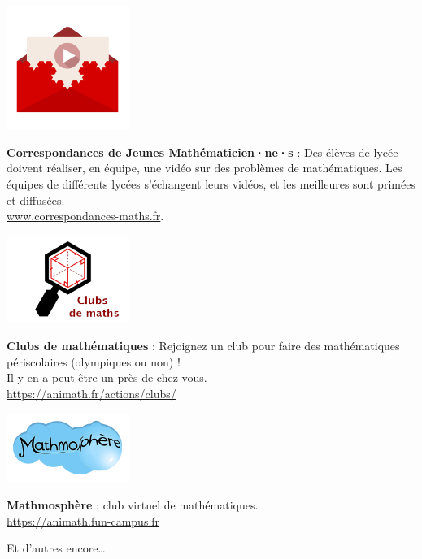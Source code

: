 \begin{minipage}[c]{.46\linewidth}
\includegraphics[width=40mm]{01-Intro/logos/correspondances.png}
\end{minipage}
\begin{minipage}[c]{.46\linewidth}	
\textbf{Correspondances de Jeunes Mathématicien·ne·s} :
Des élèves de lycée doivent réaliser, en équipe, une vidéo sur des problèmes de mathématiques. Les équipes de différents lycées s'échangent leurs vidéos, et les meilleures sont primées et diffusées.
\\ \url{www.correspondances-maths.fr}.
\end{minipage} \hfill


\vspace{4mm}



\begin{minipage}[c]{.46\linewidth}
\includegraphics[width=40mm]{01-Intro/logos/clubs_de_maths.png}
\end{minipage}
\begin{minipage}[c]{.46\linewidth}	
\textbf{Clubs de mathématiques} :
Rejoignez un club pour faire des mathématiques périscolaires (olympiques ou non) ! \\ Il y en a peut-être un près de chez vous.
\\
\url{https://animath.fr/actions/clubs/}

\end{minipage} \hfill

		
	
\vspace{4mm}



\begin{minipage}[c]{.46\linewidth}
\includegraphics[width=40mm]{01-Intro/logos/mathmosphere.png}
\end{minipage}
\begin{minipage}[c]{.46\linewidth}	
\textbf{Mathmosphère} : club virtuel de mathématiques.
\\
\url{https://animath.fun-campus.fr}

\end{minipage} \hfill
\vspace{16mm}

Et d'autres encore…

\vfill
		
	
\pagebreak
